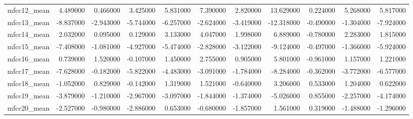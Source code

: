 \begin{table}[H]
{\begin{tabular}{lrrrrrrrrrr}
mfcc12\_mean & 4.489000 & 0.466000 & 3.425000 & 5.831000 & 7.390000 & 2.820000 & 13.629000 & 0.224000 & 5.268000 & 5.817000 \\
mfcc13\_mean & -8.837000 & -2.943000 & -5.744000 & -6.257000 & -2.624000 & -3.419000 & -12.318000 & -0.490000 & -1.304000 & -7.924000 \\
mfcc14\_mean & 2.032000 & 0.095000 & 0.129000 & 3.133000 & 4.047000 & 1.998000 & 6.889000 & -0.780000 & 2.283000 & 1.815000 \\
mfcc15\_mean & -7.408000 & -1.081000 & -4.927000 & -5.474000 & -2.828000 & -3.122000 & -9.124000 & -0.497000 & -1.366000 & -5.924000 \\
mfcc16\_mean & 0.739000 & 1.520000 & -0.107000 & 1.450000 & 2.755000 & 0.905000 & 5.801000 & -0.961000 & 1.157000 & 1.221000 \\
mfcc17\_mean & -7.628000 & -0.182000 & -5.822000 & -4.483000 & -3.091000 & -1.784000 & -8.284000 & -0.362000 & -3.772000 & -6.577000 \\
mfcc18\_mean & -1.052000 & 0.829000 & -0.142000 & 1.319000 & 1.521000 & -0.640000 & 3.206000 & 0.533000 & 1.204000 & 0.622000 \\
mfcc19\_mean & -3.879000 & -1.210000 & -2.967000 & -3.097000 & -1.844000 & -1.374000 & -5.026000 & 0.855000 & -2.257000 & -4.174000 \\
mfcc20\_mean & -2.527000 & -0.980000 & -2.886000 & 0.653000 & -0.680000 & -1.857000 & 1.561000 & 0.319000 & -1.488000 & -1.296000 \\
\bottomrule
\end{tabular}
}
\end{table}
